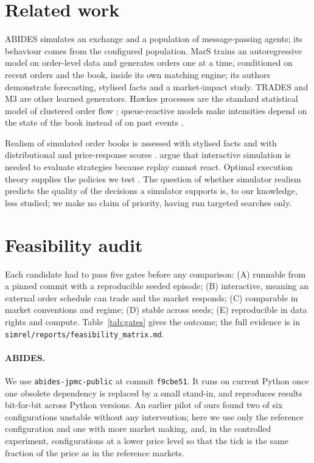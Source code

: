 \section{Related work}

ABIDES \citep{byrd2019abides} simulates an exchange and a population of message-passing agents; its behaviour comes from the configured population. MarS \citep{li2025mars} trains an autoregressive model on order-level data and generates orders one at a time, conditioned on recent orders and the book, inside its own matching engine; its authors demonstrate forecasting, stylised facts and a market-impact study. TRADES \citep{berti2025trades} and M3 \citep{zhang2026m3} are other learned generators. Hawkes processes are the standard statistical model of clustered order flow \citep{bacry2015hawkes}; queue-reactive models make intensities depend on the state of the book instead of on past events \citep{huang2015queue,cont2010stochastic}.

Realism of simulated order books is assessed with stylised facts \citep{vyetrenko2020getreal} and with distributional and price-response scores \citep{nagy2025lobbench}. \citet{balch2019evaluate} argue that interactive simulation is needed to evaluate strategies because replay cannot react. Optimal execution theory supplies the policies we test \citep{almgren2001optimal}. The question of whether simulator realism predicts the quality of the decisions a simulator supports is, to our knowledge, less studied; we make no claim of priority, having run targeted searches only.

\section{Feasibility audit}
\label{sec:feasibility}

Each candidate had to pass five gates before any comparison: (A) runnable from a pinned commit with a reproducible seeded episode; (B) interactive, meaning an external order schedule can trade and the market responds; (C) comparable in market conventions and regime; (D) stable across seeds; (E) reproducible in data rights and compute. Table~\ref{tab:gates} gives the outcome; the full evidence is in \texttt{simrel/reports/feasibility\_matrix.md}.



\paragraph{ABIDES.} We use \texttt{abides-jpmc-public} at commit \texttt{f9cbe51}. It runs on current Python once one obsolete dependency is replaced by a small stand-in, and reproduces results bit-for-bit across Python versions. An earlier pilot of ours found two of six configurations unstable without any intervention; here we use only the reference configuration and one with more market making, and, in the controlled experiment, configurations at a lower price level so that the tick is the same fraction of the price as in the reference markets.

